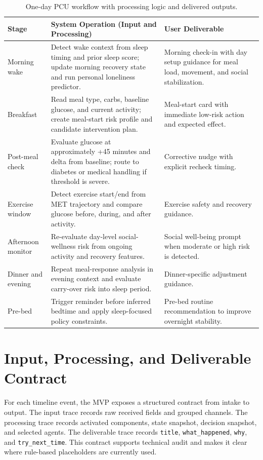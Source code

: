 \documentclass[11pt]{article}
\begin{document}
\begin{table}[h]
\centering
\small
\setlength{\tabcolsep}{4pt}
\begin{tabularx}{\textwidth}{>{\raggedright\arraybackslash}p{} >{\raggedright\arraybackslash}p{} >{\raggedright\arraybackslash}X}
\toprule
Stage & System Operation (Input and Processing) & User Deliverable \\
\midrule
Morning wake & Detect wake context from sleep timing and prior sleep score; update morning recovery state and run personal loneliness predictor. & Morning check-in with day setup guidance for meal load, movement, and social stabilization. \\
Breakfast & Read meal type, carbs, baseline glucose, and current activity; create meal-start risk profile and candidate intervention plan. & Meal-start card with immediate low-risk action and expected effect. \\
Post-meal check & Evaluate glucose at approximately +45 minutes and delta from baseline; route to diabetes or medical handling if threshold is severe. & Corrective nudge with explicit recheck timing. \\
Exercise window & Detect exercise start/end from MET trajectory and compare glucose before, during, and after activity. & Exercise safety and recovery guidance. \\
Afternoon monitor & Re-evaluate day-level social-wellness risk from ongoing activity and recovery features. & Social well-being prompt when moderate or high risk is detected. \\
Dinner and evening & Repeat meal-response analysis in evening context and evaluate carry-over risk into sleep period. & Dinner-specific adjustment guidance. \\
Pre-bed & Trigger reminder before inferred bedtime and apply sleep-focused policy constraints. & Pre-bed routine recommendation to improve overnight stability. \\
\bottomrule
\end{tabularx}
\caption{One-day PCU workflow with processing logic and delivered outputs.}
\label{tab:workflow}
\end{table}

\section{Input, Processing, and Deliverable Contract}
For each timeline event, the MVP exposes a structured contract from intake to output. The input trace records raw received fields and grouped channels. The processing trace records activated components, state snapshot, decision snapshot, and selected agents. The deliverable trace records \texttt{title}, \texttt{what\_happened}, \texttt{why}, and \texttt{try\_next\_time}. This contract supports technical audit and makes it clear where rule-based placeholders are currently used.
\end{document}
